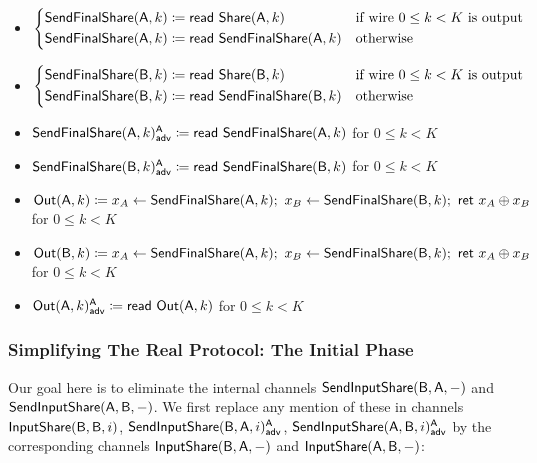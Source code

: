 \begin{itemize}
\item $\begin{cases*} \SendFinalShare(\A,k) \coloneqq \read{\Share(\A,k)} & \text{if wire $0 \leq k < K$ is output} \\ \SendFinalShare(\A,k) \coloneqq \read{\SendFinalShare(\A,k)} & \text{otherwise} \end{cases*}$
\item $\begin{cases*} \SendFinalShare(\B,k) \coloneqq \read{\Share(\B,k)} & \text{if wire $0 \leq k < K$ is output} \\ \SendFinalShare(\B,k) \coloneqq \read{\SendFinalShare(\B,k)} & \text{otherwise} \end{cases*}$
\item {\color{blue} $\mathsf{SendFinalShare}(\mathsf{A},k)^{\mathsf{A}}_{\mathsf{adv}} \coloneqq \mathsf{read} \ \mathsf{SendFinalShare}(\mathsf{A},k)$ for $0 \leq k < K$}
\item {\color{blue} $\mathsf{SendFinalShare}(\mathsf{B},k)^{\mathsf{A}}_{\mathsf{adv}} \coloneqq \mathsf{read} \ \mathsf{SendFinalShare}(\mathsf{B},k)$ for $0 \leq k < K$}
\item $\Out(\A,k) \coloneqq x_A \leftarrow \SendFinalShare(\A,k); \ x_B \leftarrow \SendFinalShare(\B,k); \ \ret{x_A \oplus x_B}$ for $0 \leq k < K$
\item $\Out(\B,k) \coloneqq x_A \leftarrow \SendFinalShare(\A,k); \ x_B \leftarrow \SendFinalShare(\B,k); \ \ret{x_A \oplus x_B}$ for $0 \leq k < K$
\item {\color{blue} $\mathsf{Out}(\mathsf{A},k)^{\mathsf{A}}_{\mathsf{adv}} \coloneqq \mathsf{read} \ \mathsf{Out}(\mathsf{A},k)$ for $0 \leq k < K$}
\end{itemize}

\subsubsection{Simplifying The Real Protocol: The Initial Phase}
Our goal here is to eliminate the internal channels $\mathsf{SendInputShare}(\mathsf{B},\mathsf{A},-)$ and $\mathsf{SendInputShare}(\mathsf{A},\mathsf{B},-)$. We first replace any mention of these in channels $\mathsf{InputShare}(\mathsf{B},\mathsf{B},i)$, $\mathsf{SendInputShare}(\mathsf{B},\mathsf{A},i)^{\mathsf{A}}_{\mathsf{adv}}$, $\mathsf{SendInputShare}(\mathsf{A},\mathsf{B},i)^{\mathsf{A}}_{\mathsf{adv}}$ by the corresponding channels $\mathsf{InputShare}(\mathsf{B},\mathsf{A},-)$ and $\mathsf{InputShare}(\mathsf{A},\mathsf{B},-)$:


